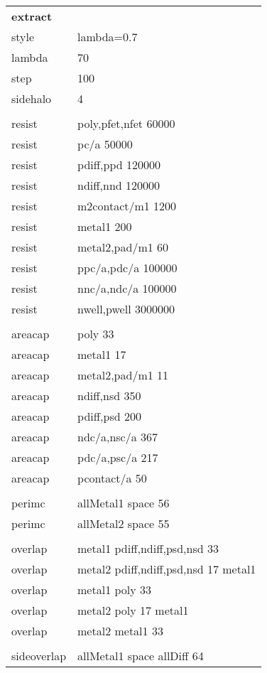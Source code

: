 \documentclass[letterpaper,twoside,12pt]{article}
\def\vns{\vspace*{-0.05in}}
\begin{document}
\begin{table}[ht!p]
   \begin{center}
      \begin{tabular}{|ll|} \hline
	{\bfseries extract} & \\
	style	  & 	lambda=0.7 \\
	lambda	  & 	70 \\
	step	  & 	100 \\
	sidehalo  &	4 \\ \vns
	& \\
	resist	  &	poly,pfet,nfet 60000 \\
	resist	  &	pc/a 50000 \\
	resist	  &	pdiff,ppd 120000 \\
	resist	  &	ndiff,nnd 120000 \\
	resist	  &	m2contact/m1 1200 \\
	resist	  &	metal1 200 \\
	resist	  &	metal2,pad/m1 60 \\
	resist	  &	ppc/a,pdc/a 100000 \\
	resist	  &	nnc/a,ndc/a 100000 \\
	resist	  &	nwell,pwell 3000000 \\ \vns
	& \\
	areacap	  &	poly 33 \\
	areacap	  &	metal1 17 \\
	areacap	  &	metal2,pad/m1 11 \\
	areacap	  &	ndiff,nsd 350 \\
	areacap	  &	pdiff,psd 200 \\
	areacap	  &	ndc/a,nsc/a 367 \\
	areacap	  &	pdc/a,psc/a 217 \\
	areacap	  &	pcontact/a 50 \\ \vns
	& \\
	perimc	  &	allMetal1 space 56 \\
	perimc	  &	allMetal2 space 55 \\ \vns
	& \\
	overlap	  &	metal1 pdiff,ndiff,psd,nsd 33 \\
	overlap	  &	metal2 pdiff,ndiff,psd,nsd 17 metal1 \\
	overlap	  &	metal1 poly 33 \\
	overlap	  &	metal2 poly 17 metal1 \\
	overlap	  &	metal2 metal1 33 \\ \vns
	& \\
	sideoverlap &	allMetal1 space allDiff 64 \\

\end{tabular}
\end{center}
\end{table}
\end{document}
